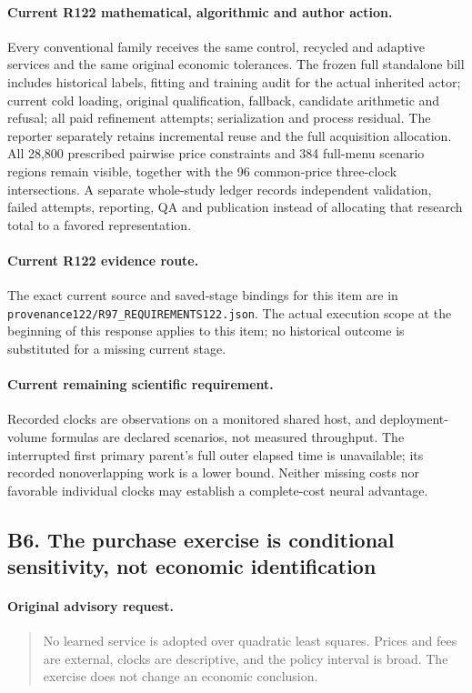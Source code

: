\paragraph{Current R122 mathematical, algorithmic and author action.}
Every conventional family receives the same control, recycled and adaptive services and the same original economic tolerances. The frozen full standalone bill includes historical labels, fitting and training audit for the actual inherited actor; current cold loading, original qualification, fallback, candidate arithmetic and refusal; all paid refinement attempts; serialization and process residual. The reporter separately retains incremental reuse and the full acquisition allocation. All 28,800 prescribed pairwise price constraints and 384 full-menu scenario regions remain visible, together with the 96 common-price three-clock intersections. A separate whole-study ledger records independent validation, failed attempts, reporting, QA and publication instead of allocating that research total to a favored representation.
\paragraph{Current R122 evidence route.}
The exact current source and saved-stage bindings for this item are in \nolinkurl{provenance122/R97_REQUIREMENTS122.json}. The actual execution scope at the beginning of this response applies to this item; no historical outcome is substituted for a missing current stage.
\paragraph{Current remaining scientific requirement.}
Recorded clocks are observations on a monitored shared host, and deployment-volume formulas are declared scenarios, not measured throughput. The interrupted first primary parent's full outer elapsed time is unavailable; its recorded nonoverlapping work is a lower bound. Neither missing costs nor favorable individual clocks may establish a complete-cost neural advantage.

\subsection{B6. The purchase exercise is conditional sensitivity, not economic identification}
\label{response122:B6}

\paragraph{Original advisory request.}
\begin{quote}
No learned service is adopted over quadratic least squares. Prices and fees are external, clocks are descriptive, and the policy interval is broad. The exercise does not change an economic conclusion.
\end{quote}


